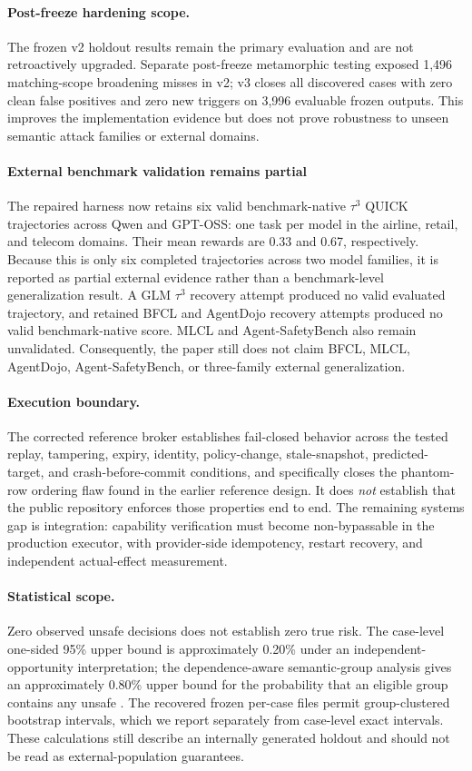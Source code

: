 \paragraph{Post-freeze hardening scope.}
The frozen v2 holdout results remain the primary evaluation and are not retroactively upgraded. Separate post-freeze metamorphic testing exposed 1,496 matching-scope broadening misses in v2; v3 closes all discovered cases with zero clean false positives and zero new triggers on 3,996 evaluable frozen outputs. This improves the implementation evidence but does not prove robustness to unseen semantic attack families or external domains.

\paragraph{External benchmark validation remains partial}
The repaired harness now retains six valid benchmark-native $\tau^3$ QUICK trajectories across Qwen and GPT-OSS: one task per model in the airline, retail, and telecom domains. Their mean rewards are 0.33 and 0.67, respectively. Because this is only six completed trajectories across two model families, it is reported as partial external evidence rather than a benchmark-level generalization result. A GLM $\tau^3$ recovery attempt produced no valid evaluated trajectory, and retained BFCL and AgentDojo recovery attempts produced no valid benchmark-native score. MLCL and Agent-SafetyBench also remain unvalidated. Consequently, the paper still does not claim BFCL, MLCL, AgentDojo, Agent-SafetyBench, or three-family external generalization.

\paragraph{Execution boundary.}
The corrected reference broker establishes fail-closed behavior across the tested replay, tampering, expiry, identity, policy-change, stale-snapshot, predicted-target, and crash-before-commit conditions, and specifically closes the phantom-row ordering flaw found in the earlier reference design. It does \emph{not} establish that the public repository enforces those properties end to end. The remaining systems gap is integration: capability verification must become non-bypassable in the production executor, with provider-side idempotency, restart recovery, and independent actual-effect measurement.

\paragraph{Statistical scope.}
Zero observed unsafe \allow decisions does not establish zero true risk. The case-level one-sided 95\% upper bound is approximately 0.20\% under an independent-opportunity interpretation; the dependence-aware semantic-group analysis gives an approximately 0.80\% upper bound for the probability that an eligible group contains any unsafe \allow. The recovered frozen per-case files permit group-clustered bootstrap intervals, which we report separately from case-level exact intervals. These calculations still describe an internally generated holdout and should not be read as external-population guarantees.

